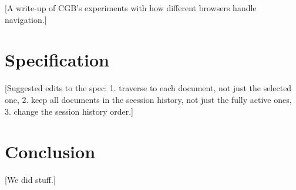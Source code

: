 \documentclass{article}
\begin{document}
[A write-up of CGB's experiments with how different browsers handle navigation.]

\section{Specification}

[Suggested edits to the spec:
  1. traverse to each document, not just the selected one,
  2. keep all documents in the seession history, not just the fully active ones,
  3. change the session history order.]

\section{Conclusion}

[We did stuff.]
\end{document}
